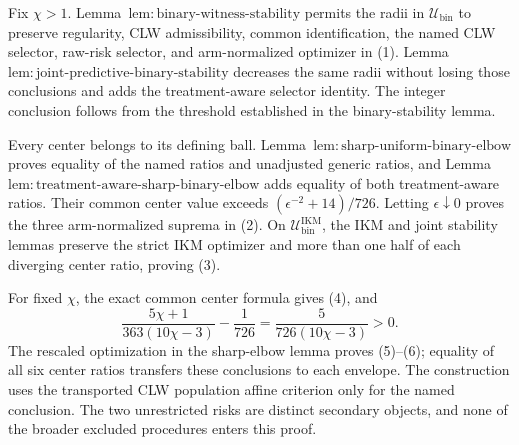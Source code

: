 Fix \(\chi>1\).  Lemma~\(\mathrm{lem{:}binary\text{-}witness\text{-}stability}\) permits the radii in \(\mathcal U_{\mathrm{bin}}\) to preserve regularity, CLW admissibility, common identification, the named CLW selector, raw-risk selector, and arm-normalized optimizer in (1).  Lemma~\(\mathrm{lem{:}joint\text{-}predictive\text{-}binary\text{-}stability}\) decreases the same radii without losing those conclusions and adds the treatment-aware selector identity.  The integer conclusion follows from the threshold established in the binary-stability lemma.

Every center belongs to its defining ball.  Lemma~\(\mathrm{lem{:}sharp\text{-}uniform\text{-}binary\text{-}elbow}\) proves equality of the named ratios and unadjusted generic ratios, and Lemma~\(\mathrm{lem{:}treatment\text{-}aware\text{-}sharp\text{-}binary\text{-}elbow}\) adds equality of both treatment-aware ratios.  Their common center value exceeds \((\epsilon^{-2}+14)/726\).  Letting \(\epsilon\downarrow0\) proves the three arm-normalized suprema in (2).  On \(\mathcal U_{\mathrm{bin}}^{\mathrm{IKM}}\), the IKM and joint stability lemmas preserve the strict IKM optimizer and more than one half of each diverging center ratio, proving (3).

For fixed \(\chi\), the exact common center formula gives (4), and
\[
 \frac{5\chi+1}{363(10\chi-3)}-\frac1{726}
 =\frac5{726(10\chi-3)}>0.                                \tag{44}
\]
The rescaled optimization in the sharp-elbow lemma proves (5)--(6); equality of all six center ratios transfers these conclusions to each envelope.  The construction uses the transported CLW population affine criterion only for the named conclusion.  The two unrestricted risks are distinct secondary objects, and none of the broader excluded procedures enters this proof.